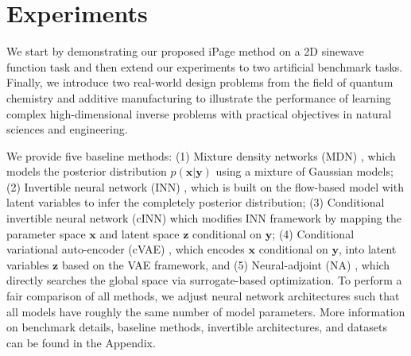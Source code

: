 \documentclass[letterpaper]{article} %
\begin{document}
\section{Experiments}
We start by demonstrating our proposed iPage method on a 2D sinewave function task and then extend our experiments to two artificial benchmark tasks. Finally, we introduce two real-world design problems from the field of quantum chemistry and additive manufacturing to illustrate the performance of learning complex high-dimensional inverse problems with practical objectives in natural sciences and engineering.

 We provide five baseline methods: (1) Mixture density networks (MDN) \citep{bishop1994mixture}, which models the posterior distribution $p(\mathbf{x}|\mathbf{y})$ using a mixture of Gaussian models; (2) Invertible neural network (INN) \citep{ardizzone2018analyzing}, which is built on the flow-based model with latent variables to infer the completely posterior distribution; (3) Conditional invertible neural network (cINN) \citep{ardizzone2019guided, rombach2020network} which modifies INN framework by mapping the parameter space $\mathbf{x}$ and latent space $\mathbf{z}$ conditional on $\mathbf{y}$; (4) Conditional variational auto-encoder (cVAE) \citep{sohn2015learning}, which encodes $\mathbf{x}$ conditional on $\mathbf{y}$, into latent variables $\mathbf{z}$ based on the VAE framework, and (5) Neural-adjoint (NA) \cite{ren2020benchmarking}, which directly searches the global space
via surrogate-based optimization. To perform a fair comparison of all methods, we adjust neural network architectures such that all models have roughly the same number of model parameters. More information on benchmark details, baseline methods, invertible architectures, and datasets can be found in the Appendix.
\end{document}
